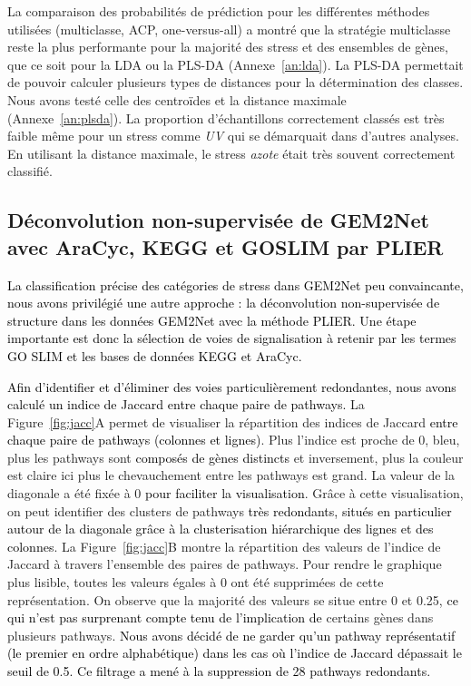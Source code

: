 \documentclass[twoside]{article}
\newcommand{\AR}[1]{\textcolor{black}{#1}}
\begin{document}
\vspace{1cm}La comparaison des probabilités de prédiction pour les différentes méthodes utilisées (multiclasse, ACP, one-versus-all) a montré que la stratégie multiclasse reste la plus performante pour la majorité des stress et des ensembles de gènes, que ce soit pour la LDA ou la PLS-DA (Annexe~\ref{an:lda}). La PLS-DA permettait de pouvoir calculer plusieurs types de distances pour la détermination des classes. Nous avons testé celle des centroïdes et la distance maximale (Annexe~\ref{an:plsda}). La proportion d'échantillons correctement classés est très faible même pour un stress comme \textit{UV} qui se démarquait dans d'autres analyses. En utilisant la distance maximale, le stress \textit{azote} était très souvent correctement classifié.


\newpage   
    \subsection{Déconvolution non-supervisée de GEM2Net avec AraCyc, KEGG et GOSLIM par PLIER}
    
\AR{La classification précise des catégories de stress dans GEM2Net peu convaincante, nous avons privilégié une autre approche : la déconvolution non-supervisée de structure dans les données GEM2Net avec la méthode PLIER. Une étape importante est donc la sélection de voies de signalisation à retenir par les termes GO SLIM et les bases de données KEGG et AraCyc.}

\vspace{0.3cm}\AR{Afin d'identifier et d'éliminer des voies particulièrement redondantes, nous avons calculé un indice de Jaccard entre chaque paire de pathways.} La Figure~\ref{fig:jacc}A permet de visualiser la répartition des indices de Jaccard \AR{entre chaque paire de pathways (colonnes et lignes)}. Plus l'indice est proche de 0, bleu, plus les pathways sont \AR{composés de gènes distincts} et inversement, plus la couleur est claire ici plus le chevauchement entre les pathways est grand. La valeur de la diagonale a été fixée à 0 \AR{pour faciliter la visualisation}. Grâce à cette visualisation, on peut identifier des clusters de pathways \AR{très redondants, situés en particulier autour de la diagonale grâce à la clusterisation hiérarchique des lignes et des colonnes}. La Figure~\ref{fig:jacc}B montre la répartition des valeurs de l'indice de Jaccard à travers l'ensemble des paires de pathways. Pour rendre le graphique plus lisible, toutes les valeurs égales à 0 ont été supprimées de cette représentation. On observe que la majorité des valeurs se situe entre 0 et 0.25, \AR{ce qui n'est pas surprenant compte tenu de l'implication de} certains gènes dans plusieurs pathways. \AR{Nous avons décidé de ne garder qu'un pathway représentatif (le premier en ordre alphabétique) dans les cas où l'indice de Jaccard dépassait le seuil de 0.5. Ce filtrage a mené à la suppression de 28 pathways redondants. }
\end{document}
